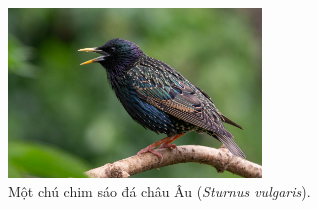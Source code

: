 \begin{figure}[!h]
    \centering\includegraphics[width=0.6\textwidth]{Problem_5/Figs_P5/fig02.jpg}\caption{Một chú chim sáo đá châu Âu (\textit{Sturnus vulgaris}).}
    \label{fig:Sturn}
\end{figure}

\ \ 
